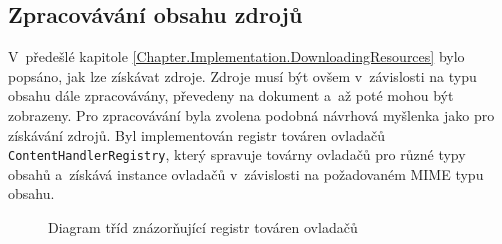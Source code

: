 \subsection{Zpracovávání obsahu zdrojů}
\label{Chapter.Implementation.ContentHandling}

V~předešlé kapitole \ref{Chapter.Implementation.DownloadingResources} bylo popsáno, jak lze získávat zdroje. Zdroje musí být ovšem v~závislosti na typu obsahu dále zpracovávány, převedeny na dokument a~až poté mohou být zobrazeny. Pro zpracovávání byla zvolena podobná návrhová myšlenka jako pro získávání zdrojů. Byl implementován registr továren ovladačů \texttt{ContentHandlerRegistry}, který spravuje továrny ovladačů pro různé typy obsahů a~získává instance ovladačů v~závislosti na požadovaném MIME typu obsahu.

\begin{figure}[H]
  \begin{center}
    \caption{Diagram tříd znázorňující registr továren ovladačů}
    \label{Figure.ContentHandlerRegistry}
  \end{center}
\end{figure}

